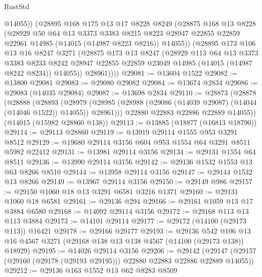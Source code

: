 \begin{lexlean}{RustStd}
\begin{coremodule}
            @14055))
        (@28895
          @168
          @175
          @13
          @17
          @8228
          @8249
          (@28875
            @168
            @13
            @8228
            (@28929
              @50
              @64
              @13
              @3373
              @3383
              @8215
              @8223
              @28947
              @22855
              @22859
              @22961
              @14985
              (@14015 (@14987 @8223 @8216))
              @14055))
          (@28895
            @173
            @106
            @13
            @16
            @8247
            @3271
            (@28875
              @173
              @13
              @8247
              (@28929
                @113
                @64
                @13
                @3373
                @3383
                @8233
                @8242
                @28947
                @22855
                @22859
                @23049
                @14985
                (@14015 (@14987 @8242 @8234))
                @14055))
            @28961))))
@29081 := @13604 @1522
@29082 := @13800 @29081
@29083 := @29080 @29082
@29084 := @13674 @2834
@29086 := @29083 (@14035 @29084)
@29087 := @13698 @2834
@29110 := @28873
    (@28878
      (@28888
        (@28893
          (@28979 (@28985 (@28988 (@29086 (@14039 @29087) (@14044 (@14046 @1522)) @14055)) @28961)))
        @22880
        @22883
        @22886
        @22889
        @14055))
    (@14015 (@15982 @28860 @138))
@29113 := @13885 (@18877 (@16813 @18790))
@29114 := @29113 @28860
@29119 := @13919 @29114 @1555 @953 @3291 @8512
@29129 := @19680 @29114 @3156 @604 @953 @1554 @64 @3291 @8511 @5982 @22412
@29131 := @13981 @29114 @3156
@29134 := @29131 @1554 @64 @8511
@29136 := @13990 @29114 @3156
@29142 := @29136 @1532 @1553 @13 @63 @8266 @8510
@29144 := @13958 @29114 @3156
@29147 := @29144 @1532 @13 @8266
@29149 := @13967 @29114 @3156
@29150 := @29149 @986
@29157 := @29150 @1060 @18 @13 @3291 @6581 @3216 @1371
@29160 := @29131 @1060 @18 @6581
@29161 := @29136 @294
@29166 := @29161 @1059 @13 @17 @3884 @6580
@29168 := @14092 @29114 @3156
@29172 := @29168 @113 @13 @113 @3884
@29173 := @14101 @29114
@29177 := @29172 (@14100 (@29173 @113)) @16421
@29178 := @29166 @29177
@29193 := @29136
    @542
    @106
    @13
    @16
    @4567
    @3271
    (@29168 @138 @13 @138 @4567 (@14100 (@29173 @138)) @18929)
@29195 := @14026 @29114 @3156
@29206 := @29142
    (@29147 (@29157 (@29160 (@29178 (@29193 @29195))) @22880 @22883 @22886 @22889 @14055))
@29212 := @29136 @163 @1552 @13 @62 @8283 @8509

\end{coremodule}
\end{lexlean}
